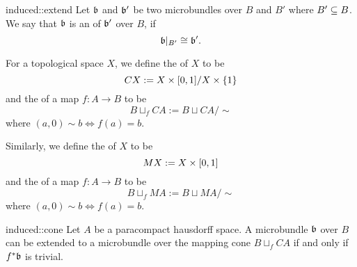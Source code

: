 \begin{mydefinition}{induced::extend}{}
    Let $\mathfrak{b}$ and $\mathfrak{b}'$ be two microbundles over $B$ and $B'$ where $B' \subseteq{} B$.
    We say that $\mathfrak{b}$ is an  of $\mathfrak{b}'$ over $B$, if
    \[ \mathfrak{b}\vert_{B'} \cong \mathfrak{b}'. \]
\end{mydefinition}

\begin{myparagraph}
    For a topological space $X$, we define the  of $X$ to be 
    \[ CX := X \times{} [0, 1] / X \times \{1\} \]
    and the  of a map $f: A \to B$ to be
    \[ B \sqcup_f CA := B \sqcup CA / \sim \]
    where $(a, 0) \sim b \iff f(a) = b$.
    
    Similarly, we define the  of $X$ to be
    \[ MX := X \times{} [0, 1] \]
    and the  of a map $f: A \to B$ to be
    \[ B \sqcup_f MA := B \sqcup MA / \sim \]
    where $(a, 0) \sim b \iff f(a) = b$.
\end{myparagraph}

\begin{mylemma}{induced::cone}{}
    Let $A$ be a paracompact hausdorff space.
    A microbundle $\mathfrak{b}$ over $B$ can be extended to a microbundle
    over the mapping cone $B \sqcup_f CA$ if and only if $f^*\mathfrak{b}$ is trivial.
\end{mylemma}

